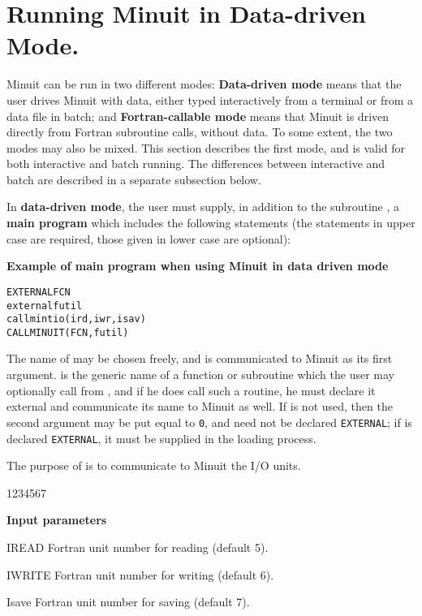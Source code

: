 \section{Running Minuit in Data-driven Mode.}

Minuit can be run in two different modes:
{\bf Data-driven mode}
means that the user drives Minuit with data, either typed
interactively from a terminal or from a data file in batch; and
{\bf Fortran-callable mode}
means that Minuit is driven directly from Fortran subroutine
calls, without data.
To some extent, the two modes may also be mixed.
This section describes the first mode, and is valid for both
interactive and batch running.
The differences between interactive and batch are described in
a separate subsection below.
 
In {\bf data-driven mode}, the user must supply,
in addition to the subroutine , a
{\bf main program} which includes the following
statements (the statements in upper case are required, those
given in lower case are optional):

\begin{center}\small\textbf{Example of main program when using Minuit in data
    driven mode}
\end{center}
\begin{alltt}\footnotesize
      EXTERNAL FCN
      external futil
      call mintio(ird,iwr,isav)
      CALL MINUIT(FCN,futil)
\end{alltt}

The name of  may be chosen freely, and is communicated
to Minuit as its first argument.
 is the generic name of a function or subroutine which the
user may optionally call from , and if he does call such
a routine, he must declare it external and communicate its
name to Minuit as well.  If  is not used, then the second
argument may be put equal to \texttt{0}, 
and need not be declared \texttt{EXTERNAL}; if  is
declared \texttt{EXTERNAL}, it must be supplied in the loading process.

\newpage


\medskip\Action
The purpose of  is to communicate to Minuit the I/O units.

\begin{DLtt}{1234567}
\item[{\rm\bf Input parameters}] \mbox{}
\item[IREAD]  Fortran unit number for reading (default 5).
\item[IWRITE] Fortran unit number for writing (default 6).
\item[Isave]  Fortran unit number for saving (default 7).
\end{DLtt}

